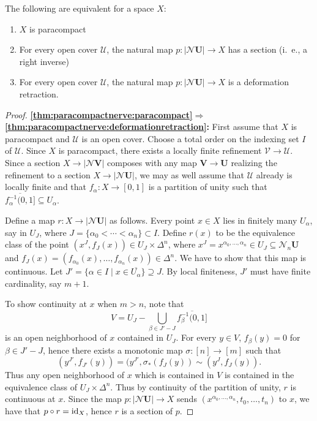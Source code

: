 \documentclass[a4paper,openany]{scrbook}
\newcommand{\nerve}{\mathcal N}
\begin{document}
\begin{thm}\label{thm:paracompactnerve}
The following are equivalent for a space $X$:
\begin{enumerate}
\item $X$ is paracompact\label{thm:paracompactnerve:paracompact}
\item For every open cover $\mathcal U$, the natural map $p\colon |\nerve \mathbf U| \to X$ has a section (i.~e., a right inverse)\label{thm:paracompactnerve:section}
\item For every open cover $\mathcal U$, the natural map $p\colon |\nerve \mathbf U| \to X$ is a deformation retraction.\label{thm:paracompactnerve:deformationretraction}
\end{enumerate}
\end{thm}
\begin{proof}
\noindent\textbf{\eqref{thm:paracompactnerve:paracompact}$\Longrightarrow$\eqref{thm:paracompactnerve:deformationretraction}:}
First assume that $X$ is paracompact and $\mathcal U$ is an open cover. Choose a total order on the indexing set $I$ of $\mathcal U$. Since $X$ is paracompact, there exists a locally finite refinement $\mathcal V \to \mathcal U$. Since a section $X \to |\nerve\mathbf V|$ composes with any map $\mathbf V \to \mathbf U$ realizing the refinement to a section $X \to |\nerve\mathbf U|$,  we may as well assume that $\mathcal U$ already is locally finite and that $f_\alpha\colon X \to [0,1]$ is a partition of unity such that $\overline{f_\alpha^{-1}(0,1]} \subseteq U_\alpha$.

Define a map $r\colon X \to |\nerve\mathbf U|$ as follows. Every point $x \in X$ lies in finitely many $U_\alpha$, say in $U_J$, where $J=\{\alpha_0 < \cdots < \alpha_n\} \subset I$. Define $r(x)$ to be the equivalence class of the point $(x^J,f_J(x)) \in U_J \times \Delta^n$, where $x^J = x^{\alpha_0,\dots,\alpha_n} \in U_J \subseteq \nerve_n\mathbf U$ and $f_J(x)=(f_{\alpha_0}(x),\dots,f_{\alpha_n}(x)) \in \Delta^n$. We have to show that this map is continuous. Let $J' = \{\alpha \in I \mid x \in \overline{U_\alpha}\} \supseteq J$. By local finiteness, $J'$ must have finite cardinality, say $m+1$. 

To show continuity at $x$ when $m>n$, note that
\[
V = U_J - \bigcup_{\beta \in J'-J} \overline{f_\beta^{-1}(0,1]}
\]
is an open neighborhood of $x$ contained in $U_J$. For every $y \in V$, $f_{\beta}(y) = 0$ for $\beta \in J'-J$, hence there exists a monotonic map $\sigma\colon [n] \to [m]$ such that
\[
(y^{J'},f_{J'}(y)) = (y^{J'},\sigma_*(f_J(y)) \sim (y^J,f_J(y)).
\]
Thus any open neighborhood of $x$ which is contained in $V$ is contained in the equivalence class of $U_J \times \Delta^n$. Thus by continuity of the partition of unity, $r$ is continuous at $x$. Since the map $p\colon |\nerve \mathbf U| \to X$ sends $(x^{\alpha_0,\dots,\alpha_n},t_0,\dots,t_n)$ to $x$, we have that $p \circ r = \operatorname{id}_X$, hence $r$ is a section of $p$.


\end{proof}
\end{document}
